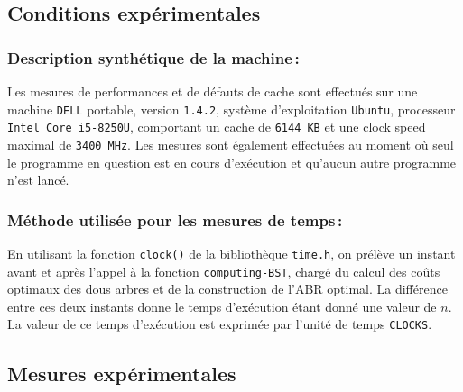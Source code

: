 \documentclass[a4paper, 10pt, french]{article}
\begin{document}
  \subsection{Conditions expérimentales}
     {

    \subsubsection{Description synthétique de la machine\,:} 
      {Les mesures de performances et de défauts de cache sont effectués sur une machine \texttt{DELL} portable, version \texttt{1.4.2}, système d'exploitation \texttt{Ubuntu}, processeur \texttt{Intel Core i5-8250U}, comportant un cache de \texttt{6144 KB} et
      une clock speed maximal de \texttt{3400 MHz}. Les mesures sont également effectuées au moment où seul le programme en question est en cours d'exécution et qu'aucun autre programme n'est lancé.
      } 

    \subsubsection{Méthode utilisée pour les mesures de temps\,: } 
      {En utilisant la fonction \texttt{clock()} de la bibliothèque \texttt{time.h}, on prélève un instant avant et après
      l'appel à la fonction \texttt{computing-BST}, chargé du calcul des coûts optimaux des dous arbres et de la construction
      de l'ABR optimal. La différence entre ces deux instants donne le temps d'exécution étant donné une valeur de $n$. La valeur de
      ce temps d'exécution est exprimée par l'unité de temps \texttt{CLOCKS}.
      }

  \subsection{Mesures expérimentales}
    {

}}
\end{document}
